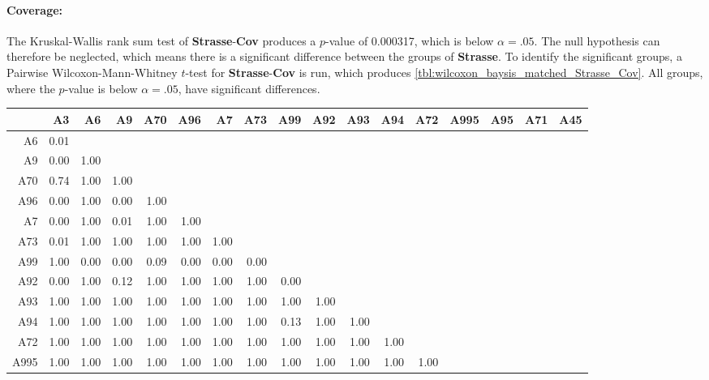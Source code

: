 \paragraph{Coverage:}
The Kruskal-Wallis rank sum test of \textbf{Strasse}-\textbf{Cov} produces a $p$-value of 0.000317, which is below $\alpha=.05$. The null hypothesis can therefore be neglected, which means there is a significant difference between the groups of \textbf{Strasse}. To identify the significant groups, a Pairwise Wilcoxon-Mann-Whitney $t$-test for \textbf{Strasse}-\textbf{Cov} is run, which produces \autoref{tbl:wilcoxon_baysis_matched_Strasse_Cov}. All groups, where the $p$-value is below $\alpha=.05$, have significant differences. 
\begin{table}[ht]
	\tiny
	\setlength{\tabcolsep}{4pt}
	\centering
	\begin{tabular}{rrrrrrrrrrrrrrrrr}
	  	\toprule
				& A3   & A6   & A9   & A70  & A96  & A7   & A73 & A99 & A92 & A93 & A94 & A72 & A995 & A95 & A71 & A45 \\ 
	  	\midrule
		A6 		& 0.01 &  &  &  &  &  &  &  &  &  &  &  &  &  &  &  \\ 
	  	A9 		& 0.00 & 1.00 &  &  &  &  &  &  &  &  &  &  &  &  &  &  \\ 
	  	A70 	& 0.74 & 1.00 & 1.00 &  &  &  &  &  &  &  &  &  &  &  &  &  \\ 
	  	A96 	& 0.00 & 1.00 & 0.00 & 1.00 &  &  &  &  &  &  &  &  &  &  &  &  \\ 
	  	A7 		& 0.00 & 1.00 & 0.01 & 1.00 & 1.00 &  &  &  &  &  &  &  &  &  &  &  \\ 
	  	A73 	& 0.01 & 1.00 & 1.00 & 1.00 & 1.00 & 1.00 &  &  &  &  &  &  &  &  &  &  \\ 
	  	A99 	& 1.00 & 0.00 & 0.00 & 0.09 & 0.00 & 0.00 & 0.00 &  &  &  &  &  &  &  &  &  \\ 
	  	A92 	& 0.00 & 1.00 & 0.12 & 1.00 & 1.00 & 1.00 & 1.00 & 0.00 &  &  &  &  &  &  &  &  \\ 
	  	A93 	& 1.00 & 1.00 & 1.00 & 1.00 & 1.00 & 1.00 & 1.00 & 1.00 & 1.00 &  &  &  &  &  &  &  \\ 
	  	A94 	& 1.00 & 1.00 & 1.00 & 1.00 & 1.00 & 1.00 & 1.00 & 0.13 & 1.00 & 1.00 &  &  &  &  &  &  \\ 
	  	A72 	& 1.00 & 1.00 & 1.00 & 1.00 & 1.00 & 1.00 & 1.00 & 1.00 & 1.00 & 1.00 & 1.00 &  &  &  &  &  \\ 
	  	A995 	& 1.00 & 1.00 & 1.00 & 1.00 & 1.00 & 1.00 & 1.00 & 1.00 & 1.00 & 1.00 & 1.00 & 1.00 &  &  &  &  \\ 

\end{tabular}
\end{table}
